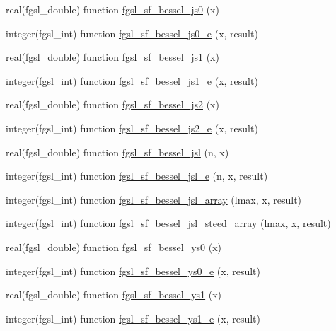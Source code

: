 \begin{DoxyCompactItemize}
\item 
real(fgsl\+\_\+double) function \hyperlink{specfunc_8finc_a2966accc3e88380bcbaee51586c8b43d}{fgsl\+\_\+sf\+\_\+bessel\+\_\+js0} (x)
\item 
integer(fgsl\+\_\+int) function \hyperlink{specfunc_8finc_a1dc8fcfff146f535450ede5e44a90cea}{fgsl\+\_\+sf\+\_\+bessel\+\_\+js0\+\_\+e} (x, result)
\item 
real(fgsl\+\_\+double) function \hyperlink{specfunc_8finc_a02f9f26c36dfe54bc655e3b93894fb90}{fgsl\+\_\+sf\+\_\+bessel\+\_\+js1} (x)
\item 
integer(fgsl\+\_\+int) function \hyperlink{specfunc_8finc_a86aaeb9694ad08a11e19d1acada66004}{fgsl\+\_\+sf\+\_\+bessel\+\_\+js1\+\_\+e} (x, result)
\item 
real(fgsl\+\_\+double) function \hyperlink{specfunc_8finc_a608f4e025e3aa1384a6789234f830848}{fgsl\+\_\+sf\+\_\+bessel\+\_\+js2} (x)
\item 
integer(fgsl\+\_\+int) function \hyperlink{specfunc_8finc_a1f79f88aefc057bb8992f2ed7f47e2b0}{fgsl\+\_\+sf\+\_\+bessel\+\_\+js2\+\_\+e} (x, result)
\item 
real(fgsl\+\_\+double) function \hyperlink{specfunc_8finc_ad3d25735619514a2f11d8f3d82a46a18}{fgsl\+\_\+sf\+\_\+bessel\+\_\+jsl} (n, x)
\item 
integer(fgsl\+\_\+int) function \hyperlink{specfunc_8finc_a115a99b84e0d4433a55530edd599c07e}{fgsl\+\_\+sf\+\_\+bessel\+\_\+jsl\+\_\+e} (n, x, result)
\item 
integer(fgsl\+\_\+int) function \hyperlink{specfunc_8finc_adad29813d45e51c21cee09228d83621e}{fgsl\+\_\+sf\+\_\+bessel\+\_\+jsl\+\_\+array} (lmax, x, result)
\item 
integer(fgsl\+\_\+int) function \hyperlink{specfunc_8finc_a83a1bfba4edb59ec86b0f4151d9e916a}{fgsl\+\_\+sf\+\_\+bessel\+\_\+jsl\+\_\+steed\+\_\+array} (lmax, x, result)
\item 
real(fgsl\+\_\+double) function \hyperlink{specfunc_8finc_a1d0cce4a15fb4e807c6085abee9d6bfc}{fgsl\+\_\+sf\+\_\+bessel\+\_\+ys0} (x)
\item 
integer(fgsl\+\_\+int) function \hyperlink{specfunc_8finc_a481cf0b90daf25842c450603ba108c16}{fgsl\+\_\+sf\+\_\+bessel\+\_\+ys0\+\_\+e} (x, result)
\item 
real(fgsl\+\_\+double) function \hyperlink{specfunc_8finc_a6bd2124b7b0c9c34d4b5a5256b99aa0f}{fgsl\+\_\+sf\+\_\+bessel\+\_\+ys1} (x)
\item 
integer(fgsl\+\_\+int) function \hyperlink{specfunc_8finc_aa60914e596879edadfc6824a44200ca3}{fgsl\+\_\+sf\+\_\+bessel\+\_\+ys1\+\_\+e} (x, result)

\end{DoxyCompactItemize}
